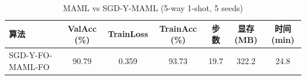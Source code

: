 \begin{table}[h]
\centering
\caption{MAML vs SGD-Y-MAML (5-way 1-shot, 5 seeds)}
\label{tab:comparison}
\begin{tabular}{lcccccc}
\toprule
算法 & ValAcc (\%) & TrainLoss & TrainAcc (\%) & 步数 & 显存(MB) & 时间(min) \\
\midrule
SGD-Y-FO-MAML-FO & 90.79 & 0.359 & 93.73 & 19.7 & 322.2 & 24.8 \\
\bottomrule
\end{tabular}
\end{table}
